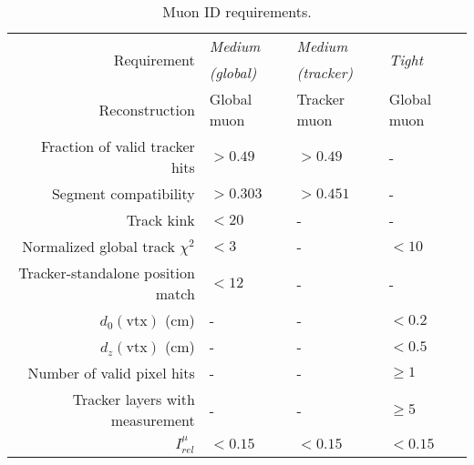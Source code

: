 \begin{table}[htp]
\begin{center} {\scriptsize
\begin{tabular}{r|l|l|l} \hline\hline
\multirow{2}{*}{Requirement}      & {\em Medium}      & {\em Medium}      & \multirow{2}{*}{\em Tight}   \\
                                  & {\em (global)}    & {\em (tracker)}   & \\\hline
Reconstruction                    & Global muon       & Tracker muon      & Global muon     \\
Fraction of valid tracker hits    & $>0.49$           & $>0.49$           & -               \\
Segment compatibility             & $>0.303$          & $>0.451$          & -               \\
Track kink                        & $<20$             & -                 & -               \\
Normalized global track $\chi^2$  & $<3$              & -                 & $<10$           \\
Tracker-standalone position match & $<12$             & -                 & -               \\
$d_0(\mathrm{vtx})$ (cm)          & -                 & -                 & $<0.2$          \\
$d_z(\mathrm{vtx})$ (cm)          & -                 & -                 & $<0.5$          \\
Number of valid pixel hits        & -                 & -                 & $\geq 1$        \\
Tracker layers with measurement   & -                 & -                 & $\geq 5$        \\
$I_{rel}^{\mu}$                   & $<0.15$           & $<0.15$           & $<0.15$         \\
\hline\hline
\end{tabular}}
\end{center}
\caption{Muon ID requirements.}
\label{tab:muonid}
\end{table}

